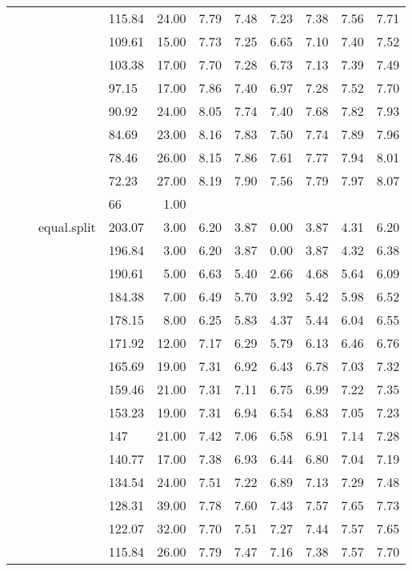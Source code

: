 \begin{longtable}{llllrrrrrrr}
   &  &  & 115.84 & 24.00 & 7.79 & 7.48 & 7.23 & 7.38 & 7.56 & 7.71 \\ 
   &  &  & 109.61 & 15.00 & 7.73 & 7.25 & 6.65 & 7.10 & 7.40 & 7.52 \\ 
   &  &  & 103.38 & 17.00 & 7.70 & 7.28 & 6.73 & 7.13 & 7.39 & 7.49 \\ 
   &  &  & 97.15 & 17.00 & 7.86 & 7.40 & 6.97 & 7.28 & 7.52 & 7.70 \\ 
   &  &  & 90.92 & 24.00 & 8.05 & 7.74 & 7.40 & 7.68 & 7.82 & 7.93 \\ 
   &  &  & 84.69 & 23.00 & 8.16 & 7.83 & 7.50 & 7.74 & 7.89 & 7.96 \\ 
   &  &  & 78.46 & 26.00 & 8.15 & 7.86 & 7.61 & 7.77 & 7.94 & 8.01 \\ 
   &  &  & 72.23 & 27.00 & 8.19 & 7.90 & 7.56 & 7.79 & 7.97 & 8.07 \\ 
   &  &  & 66 & 1.00 &  &  &  &  &  &  \\ 
   &  & equal.split & 203.07 & 3.00 & 6.20 & 3.87 & 0.00 & 3.87 & 4.31 & 6.20 \\ 
   &  &  & 196.84 & 3.00 & 6.20 & 3.87 & 0.00 & 3.87 & 4.32 & 6.38 \\ 
   &  &  & 190.61 & 5.00 & 6.63 & 5.40 & 2.66 & 4.68 & 5.64 & 6.09 \\ 
   &  &  & 184.38 & 7.00 & 6.49 & 5.70 & 3.92 & 5.42 & 5.98 & 6.52 \\ 
   &  &  & 178.15 & 8.00 & 6.25 & 5.83 & 4.37 & 5.44 & 6.04 & 6.55 \\ 
   &  &  & 171.92 & 12.00 & 7.17 & 6.29 & 5.79 & 6.13 & 6.46 & 6.76 \\ 
   &  &  & 165.69 & 19.00 & 7.31 & 6.92 & 6.43 & 6.78 & 7.03 & 7.32 \\ 
   &  &  & 159.46 & 21.00 & 7.31 & 7.11 & 6.75 & 6.99 & 7.22 & 7.35 \\ 
   &  &  & 153.23 & 19.00 & 7.31 & 6.94 & 6.54 & 6.83 & 7.05 & 7.23 \\ 
   &  &  & 147 & 21.00 & 7.42 & 7.06 & 6.58 & 6.91 & 7.14 & 7.28 \\ 
   &  &  & 140.77 & 17.00 & 7.38 & 6.93 & 6.44 & 6.80 & 7.04 & 7.19 \\ 
   &  &  & 134.54 & 24.00 & 7.51 & 7.22 & 6.89 & 7.13 & 7.29 & 7.48 \\ 
   &  &  & 128.31 & 39.00 & 7.78 & 7.60 & 7.43 & 7.57 & 7.65 & 7.73 \\ 
   &  &  & 122.07 & 32.00 & 7.70 & 7.51 & 7.27 & 7.44 & 7.57 & 7.65 \\ 
   &  &  & 115.84 & 26.00 & 7.79 & 7.47 & 7.16 & 7.38 & 7.57 & 7.70 \\ 

\end{longtable}
